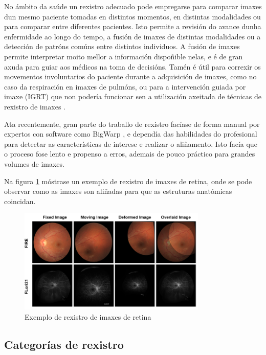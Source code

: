 No ámbito da saúde un rexistro adecuado pode empregarse para comparar imaxes dun mesmo paciente tomadas en distintos momentos, en distintas modalidades ou para comparar entre diferentes pacientes.
Isto permite a revisión do avance dunha enfermidade ao longo do tempo, a fusión de imaxes de distintas modalidades ou a detección de patróns comúns entre distintos individuos.
A fusión de imaxes permite interpretar moito mellor a información dispoñible nelas, e é de gran axuda para guiar aos médicos na toma de decisións.
Tamén é útil para correxir os movementos involuntarios do paciente durante a adquisición de imaxes, como no caso da respiración en imaxes de pulmóns, ou para a intervención guiada por imaxe (\gls{IGRT}) que non 
podería funcionar sen a utilización axeitada de técnicas de rexistro de imaxes \cite{wang2022neuralrenderingstereo3d}. 

Ata recentemente, gran parte do traballo de rexistro facíase de forma manual por expertos con software como BigWarp \cite{bigwarp}, 
e dependía das habilidades do profesional para detectar as características de interese e realizar o aliñamento.
Isto facía que o proceso fose lento e propenso a erros, ademais de pouco práctico para grandes volumes de imaxes.

Na figura \ref{fig:retin_reg} móstrase un exemplo de rexistro de imaxes de retina, onde se pode observar como as imaxes son aliñadas para que as estruturas anatómicas coincidan.

\begin{figure}[tbp]
    \centering
    \includegraphics[width=0.8\textwidth]{imaxes/retin-reg.png}
    \caption{Exemplo de rexistro de imaxes de retina \cite{sivaraman2024retinaregnetzeroshotapproachretinal}}
    \label{fig:retin_reg}
\end{figure}

\subsection{Categorías de rexistro}
\label{subsec:Categorías de rexistro}

